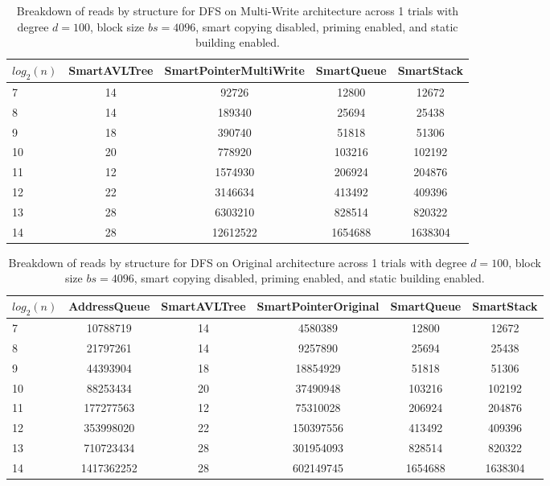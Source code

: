 \begin{table}[]
\centering
\begin{tabular}{|l|c|c|c|c|}
$log_2(n)$ & SmartAVLTree & SmartPointerMultiWrite & SmartQueue & SmartStack \\ \hline
7 & 14 & 92726 & 12800 & 12672 \\ \hline
8 & 14 & 189340 & 25694 & 25438 \\ \hline
9 & 18 & 390740 & 51818 & 51306 \\ \hline
10 & 20 & 778920 & 103216 & 102192 \\ \hline
11 & 12 & 1574930 & 206924 & 204876 \\ \hline
12 & 22 & 3146634 & 413492 & 409396 \\ \hline
13 & 28 & 6303210 & 828514 & 820322 \\ \hline
14 & 28 & 12612522 & 1654688 & 1638304 \\ \hline
\end{tabular}
\caption{Breakdown of reads by structure for DFS on Multi-Write architecture across 1 trials with degree $d=100$, block size $bs=4096$, smart copying disabled, priming enabled, and static building enabled.}
    \label{tab:reads_by_structure_dfs_d100_bs4096_trials1_copiesfalse_primetrue_staticinsertiontrue_ptmultiwrite_movetrue}
\end{table}

\begin{table}[]
\centering
\begin{tabular}{|l|c|c|c|c|c|}
$log_2(n)$ & AddressQueue & SmartAVLTree & SmartPointerOriginal & SmartQueue & SmartStack \\ \hline
7 & 10788719 & 14 & 4580389 & 12800 & 12672 \\ \hline
8 & 21797261 & 14 & 9257890 & 25694 & 25438 \\ \hline
9 & 44393904 & 18 & 18854929 & 51818 & 51306 \\ \hline
10 & 88253434 & 20 & 37490948 & 103216 & 102192 \\ \hline
11 & 177277563 & 12 & 75310028 & 206924 & 204876 \\ \hline
12 & 353998020 & 22 & 150397556 & 413492 & 409396 \\ \hline
13 & 710723434 & 28 & 301954093 & 828514 & 820322 \\ \hline
14 & 1417362252 & 28 & 602149745 & 1654688 & 1638304 \\ \hline
\end{tabular}
\caption{Breakdown of reads by structure for DFS on Original architecture across 1 trials with degree $d=100$, block size $bs=4096$, smart copying disabled, priming enabled, and static building enabled.}
    \label{tab:reads_by_structure_dfs_d100_bs4096_trials1_copiesfalse_primetrue_staticinsertiontrue_ptoriginal_movefalse}
\end{table}

